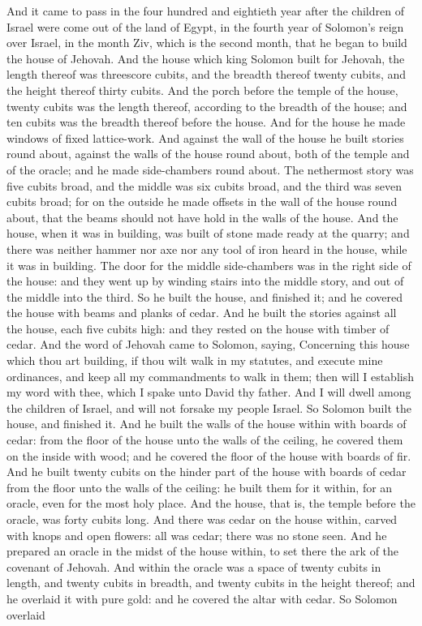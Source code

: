 And it came to pass in the four hundred and eightieth year after the children of Israel were come out of the land of Egypt, in the fourth year of Solomon’s reign over Israel, in the month Ziv, which is the second month, that he began to build the house of Jehovah. And the house which king Solomon built for Jehovah, the length thereof was threescore cubits, and the breadth thereof twenty cubits, and the height thereof thirty cubits. And the porch before the temple of the house, twenty cubits was the length thereof, according to the breadth of the house; and ten cubits was the breadth thereof before the house. And for the house he made windows of fixed lattice-work. And against the wall of the house he built stories round about, against the walls of the house round about, both of the temple and of the oracle; and he made side-chambers round about. The nethermost story was five cubits broad, and the middle was six cubits broad, and the third was seven cubits broad; for on the outside he made offsets in the wall of the house round about, that the beams should not have hold in the walls of the house. And the house, when it was in building, was built of stone made ready at the quarry; and there was neither hammer nor axe nor any tool of iron heard in the house, while it was in building. The door for the middle side-chambers was in the right side of the house: and they went up by winding stairs into the middle story, and out of the middle into the third. So he built the house, and finished it; and he covered the house with beams and planks of cedar. And he built the stories against all the house, each five cubits high: and they rested on the house with timber of cedar.  And the word of Jehovah came to Solomon, saying, Concerning this house which thou art building, if thou wilt walk in my statutes, and execute mine ordinances, and keep all my commandments to walk in them; then will I establish my word with thee, which I spake unto David thy father. And I will dwell among the children of Israel, and will not forsake my people Israel.  So Solomon built the house, and finished it. And he built the walls of the house within with boards of cedar: from the floor of the house unto the walls of the ceiling, he covered them on the inside with wood; and he covered the floor of the house with boards of fir. And he built twenty cubits on the hinder part of the house with boards of cedar from the floor unto the walls of the ceiling: he built them for it within, for an oracle, even for the most holy place. And the house, that is, the temple before the oracle, was forty cubits long. And there was cedar on the house within, carved with knops and open flowers: all was cedar; there was no stone seen. And he prepared an oracle in the midst of the house within, to set there the ark of the covenant of Jehovah. And within the oracle was a space of twenty cubits in length, and twenty cubits in breadth, and twenty cubits in the height thereof; and he overlaid it with pure gold: and he covered the altar with cedar. So Solomon overlaid 